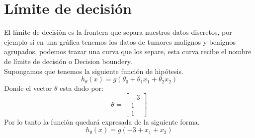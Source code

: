 \documentclass{report}
\begin{document}
\section{Límite de decisión}
El límite de decisión es la frontera que separa nuestros datos discretos, por ejemplo si en una gráfica tenemos los datos de tumores malignos y benignos agrupados, podemos trazar una curva que los separe, esta curva recibe el nombre de límite de decisión o Decision boundery.\\Supongamos que tenemos la siguiente función de hipótesis.
\begin{equation}
h_\theta(x)=g(\theta_0+\theta_1x_1+\theta_2x_2)
\label{Eq:HipLogistic}
\end{equation}
Donde el vector $ \theta $ esta dado por:
\[
\theta=\left[\begin{array}{c}
-3\\1\\1
\end{array}\right]
\]
 Por lo tanto la función quedará expresada de la siguiente forma. 
\[
h_\theta(x)=g(-3+x_1+x_2)
\]
\end{document}
